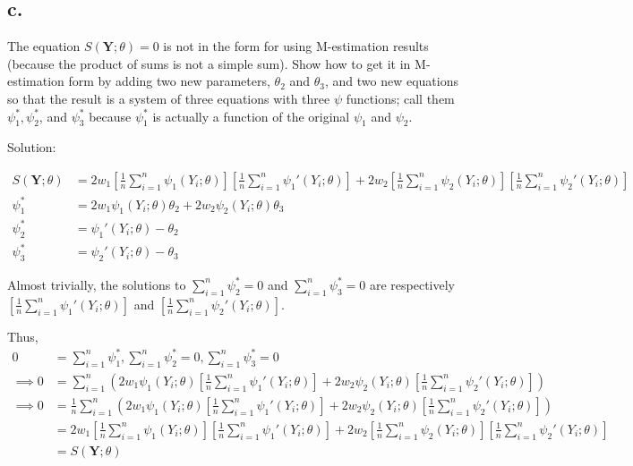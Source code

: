 \documentclass[
  letterpaper,
  DIV=11,
  numbers=noendperiod]{scrreprt}
\begin{document}
\hypertarget{c.-4}{%
\subsection{c.~}\label{c.-4}}

The equation \(S(\mathbf Y; \theta) = 0\) is not in the form for using
M-estimation results (because the product of sums is not a simple sum).
Show how to get it in M-estimation form by adding two new parameters,
\(\theta_2\) and \(\theta_3\), and two new equations so that the result
is a system of three equations with three \(\psi\) functions; call them
\(\psi_1^*, \psi_2^*\), and \(\psi_3^*\) because \(\psi_1^*\) is
actually a function of the original \(\psi_1\) and \(\psi_2\).

Solution:

\[\begin{aligned}
S(\mathbf Y; \theta) &= 2w_1\left[\frac 1 n \sum_{i=1}^n \psi_1 (Y_i;  \theta)\right]\left[\frac 1 n \sum_{i=1}^n \psi_1 '(Y_i;  \theta)\right] +2w_2\left[\frac 1 n \sum_{i=1}^n \psi_2 (Y_i;  \theta)\right]\left[\frac 1 n \sum_{i=1}^n \psi_2 '(Y_i;  \theta)\right] \\
\psi_1^* &= 2w_1 \psi_1 (Y_i;  \theta) \theta_2 +2w_2\psi_2 (Y_i;  \theta)\theta_3\\
\psi_2^* &= \psi_1'(Y_i; \theta) - \theta_2 \\
\psi_3^* &= \psi_2'(Y_i; \theta) - \theta_3
\end{aligned}\]

Almost trivially, the solutions to \(\sum_{i=1}^n \psi_2^* = 0\) and
\(\sum_{i=1}^n \psi_3^* = 0\) are respectively
\(\left[\frac 1 n \sum_{i=1}^n \psi_1 '(Y_i; \theta)\right]\) and
\(\left[\frac 1 n \sum_{i=1}^n \psi_2 '(Y_i; \theta)\right]\).

Thus, \[\begin{aligned}
0&= \sum_{i=1}^n \psi_1^*,\sum_{i=1}^n \psi_2^* = 0,\sum_{i=1}^n \psi_3^* = 0\\
\implies 0 &= \sum_{i=1}^n \left(2w_1 \psi_1 (Y_i;  \theta) \left[\frac 1 n \sum_{i=1}^n \psi_1 '(Y_i;  \theta)\right] +2w_2\psi_2 (Y_i;  \theta)\left[\frac 1 n \sum_{i=1}^n \psi_2 '(Y_i;  \theta)\right] \right) \\
\implies 0 &= \frac 1 n\sum_{i=1}^n \left(2w_1 \psi_1 (Y_i;  \theta) \left[\frac 1 n \sum_{i=1}^n \psi_1 '(Y_i;  \theta)\right] +2w_2\psi_2 (Y_i;  \theta)\left[\frac 1 n \sum_{i=1}^n \psi_2 '(Y_i;  \theta)\right] \right) \\
&= 2w_1\left[\frac 1 n \sum_{i=1}^n \psi_1 (Y_i;  \theta)\right]\left[\frac 1 n \sum_{i=1}^n \psi_1 '(Y_i;  \theta)\right] +2w_2\left[\frac 1 n \sum_{i=1}^n \psi_2 (Y_i;  \theta)\right]\left[\frac 1 n \sum_{i=1}^n \psi_2 '(Y_i;  \theta)\right] \\
&= S(\mathbf Y; \theta)
\end{aligned}\]
\end{document}
